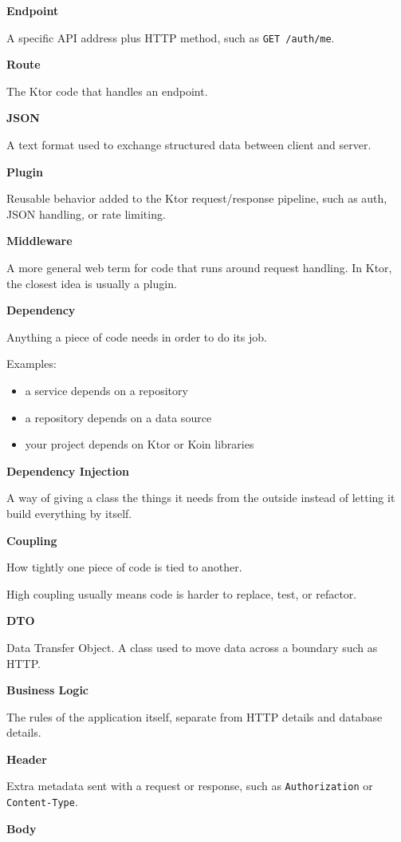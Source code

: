 \documentclass[11pt,a4paper]{article}
\begin{document}
\textbf{Endpoint}

A specific API address plus HTTP method, such as \texttt{GET /auth/me}.

\textbf{Route}

The Ktor code that handles an endpoint.

\textbf{JSON}

A text format used to exchange structured data between client and server.

\textbf{Plugin}

Reusable behavior added to the Ktor request/response pipeline, such as auth, JSON handling, or rate limiting.

\textbf{Middleware}

A more general web term for code that runs around request handling. In Ktor, the closest idea is usually a plugin.

\textbf{Dependency}

Anything a piece of code needs in order to do its job.

Examples:
\begin{itemize}
    \item a service depends on a repository
    \item a repository depends on a data source
    \item your project depends on Ktor or Koin libraries
\end{itemize}

\textbf{Dependency Injection}

A way of giving a class the things it needs from the outside instead of letting it build everything by itself.

\textbf{Coupling}

How tightly one piece of code is tied to another.

High coupling usually means code is harder to replace, test, or refactor.

\textbf{DTO}

Data Transfer Object. A class used to move data across a boundary such as HTTP.

\textbf{Business Logic}

The rules of the application itself, separate from HTTP details and database details.

\textbf{Header}

Extra metadata sent with a request or response, such as \texttt{Authorization} or \texttt{Content-Type}.

\textbf{Body}
\end{document}
